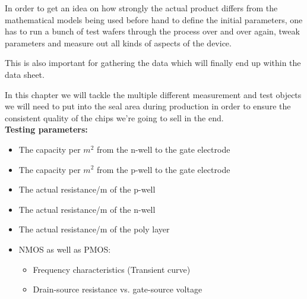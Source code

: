 In order to get an idea on how strongly the actual product differs from the mathematical models being used before hand to define the initial parameters, one has to run a bunch of test wafers through the process over and over again, tweak parameters and measure out all kinds of aspects of the device.

This is also important for gathering the data which will finally end up within the data sheet.

In this chapter we will tackle the multiple different measurement and test objects we will need to put into the seal area during production in order to ensure the consistent quality of the chips we're going to sell in the end.\\

\textbf{Testing parameters:}
\begin{itemize}
	\item The capacity per $m^2$ from the n-well to the gate electrode
	\item The capacity per $m^2$ from  the p-well to the gate electrode
	\item The actual resistance/m of the p-well
	\item The actual resistance/m of the n-well
	\item The actual resistance/m of the poly layer
	\item NMOS as well as PMOS:
	\begin{itemize}
		\item Frequency characteristics (Transient curve)
		\item Drain-source resistance vs. gate-source voltage
	\end{itemize}
\end{itemize}
